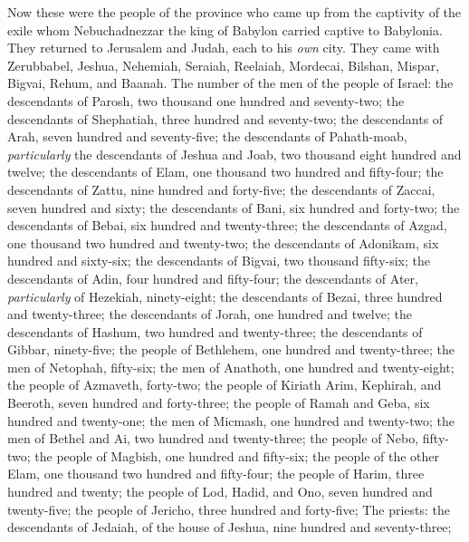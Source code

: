 \begin{biblechapter} %
 Now these were the people of the province who came up from the captivity of the exile whom Nebuchadnezzar the king of Babylon carried captive to Babylonia. They returned to Jerusalem and Judah, each to his \textit{own} city.
\verse They came with Zerubbabel, Jeshua, Nehemiah, Seraiah, Reelaiah, Mordecai, Bilshan, Mispar, Bigvai, Rehum, and Baanah.
\verse The number of the men of the people of Israel:
\verse the descendants of Parosh, two thousand one hundred and seventy-two;
\verse the descendants of Shephatiah, three hundred and seventy-two;
\verse the descendants of Arah, seven hundred and seventy-five;
\verse the descendants of Pahath-moab, \textit{particularly} the descendants of Jeshua and Joab, two thousand eight hundred and twelve;
\verse the descendants of Elam, one thousand two hundred and fifty-four;
\verse the descendants of Zattu, nine hundred and forty-five;
\verse the descendants of Zaccai, seven hundred and sixty;
\verse the descendants of Bani, six hundred and forty-two;
\verse the descendants of Bebai, six hundred and twenty-three;
\verse the descendants of Azgad, one thousand two hundred and twenty-two;
\verse the descendants of Adonikam, six hundred and sixty-six;
\verse the descendants of Bigvai, two thousand fifty-six;
\verse the descendants of Adin, four hundred and fifty-four;
\verse the descendants of Ater, \textit{particularly} of Hezekiah, ninety-eight;
\verse the descendants of Bezai, three hundred and twenty-three;
\verse the descendants of Jorah, one hundred and twelve;
\verse the descendants of Hashum, two hundred and twenty-three;
\verse the descendants of Gibbar, ninety-five;
\verse the people of Bethlehem, one hundred and twenty-three;
\verse the men of Netophah, fifty-six;
\verse the men of Anathoth, one hundred and twenty-eight;
\verse the people of Azmaveth, forty-two;
\verse the people of Kiriath Αrim, Kephirah, and Beeroth, seven hundred and forty-three;
\verse the people of Ramah and Geba, six hundred and twenty-one;
\verse the men of Micmash, one hundred and twenty-two;
\verse the men of Bethel and Ai, two hundred and twenty-three;
\verse the people of Nebo, fifty-two;
\verse the people of Magbish, one hundred and fifty-six;
\verse the people of the other Elam, one thousand two hundred and fifty-four;
\verse the people of Harim, three hundred and twenty;
\verse the people of Lod, Hadid, and Ono, seven hundred and twenty-five;
\verse the people of Jericho, three hundred and forty-five;
\verse The priests: the descendants of Jedaiah, of the house of Jeshua, nine hundred and seventy-three;

\end{biblechapter}
